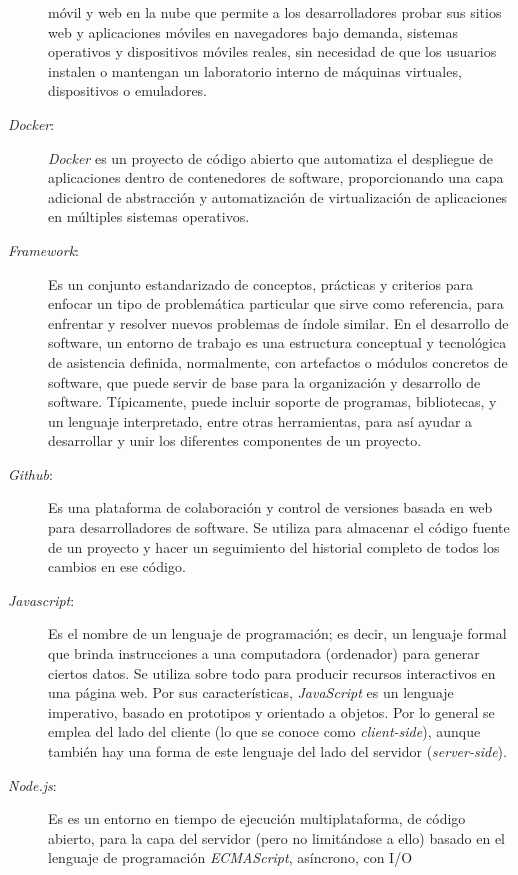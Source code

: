 \begin{description}
    móvil y web en la nube que permite a los desarrolladores probar sus sitios
    web y aplicaciones móviles en navegadores bajo demanda, sistemas operativos
    y dispositivos móviles reales, sin necesidad de que los usuarios instalen o
    mantengan un laboratorio interno de máquinas virtuales, dispositivos o
    emuladores.
\item [\emph{Docker}:] \emph{Docker} es un proyecto de código abierto que
    automatiza el despliegue de aplicaciones dentro de contenedores de software,
    proporcionando una capa adicional de abstracción y automatización de
    virtualización de aplicaciones en múltiples sistemas operativos.
\item [\emph{Framework}:] Es un conjunto estandarizado de conceptos, prácticas y
    criterios para enfocar un tipo de problemática particular que sirve como
    referencia, para enfrentar y resolver nuevos problemas de índole similar. En
    el desarrollo de software, un entorno de trabajo es una estructura
    conceptual y tecnológica de asistencia definida, normalmente, con artefactos
    o módulos concretos de software, que puede servir de base para la
    organización y desarrollo de software. Típicamente, puede incluir soporte de
    programas, bibliotecas, y un lenguaje interpretado, entre otras
    herramientas, para así ayudar a desarrollar y unir los diferentes
    componentes de un proyecto.
\item [\emph{Github}:] Es una plataforma de colaboración y control de versiones
    basada en web para desarrolladores de software. Se utiliza para almacenar el
    código fuente de un proyecto y hacer un seguimiento del historial completo
    de todos los cambios en ese código.
\item [\emph{Javascript}:] Es el nombre de un lenguaje de programación; es
    decir, un lenguaje formal que brinda instrucciones a una computadora
    (ordenador) para generar ciertos datos. Se utiliza sobre todo para producir
    recursos interactivos en una página web. Por sus características,
    \emph{JavaScript} es un lenguaje imperativo, basado en prototipos y
    orientado a objetos. Por lo general se emplea del lado del cliente (lo que
    se conoce como \emph{client-side}), aunque también hay una forma de este
    lenguaje del lado del servidor (\emph{server-side}).
\item [\emph{Node.js}:] Es es un entorno en tiempo de ejecución multiplataforma,
    de código abierto, para la capa del servidor (pero no limitándose a ello)
    basado en el lenguaje de programación \emph{ECMAScript}, asíncrono, con I/O

\end{description}
